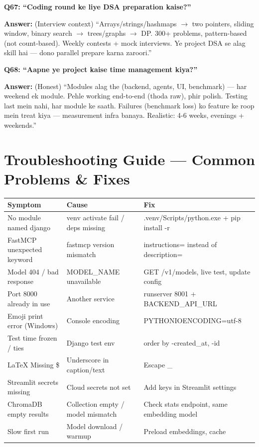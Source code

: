 \begin{interviewbox}
\textbf{Q67: ``Coding round ke liye DSA preparation kaise?''}

\textbf{Answer:} (Interview context) ``Arrays/strings/hashmaps $\rightarrow$ two pointers, sliding window, binary search $\rightarrow$ trees/graphs $\rightarrow$ DP. 300+ problems, pattern-based (not count-based). Weekly contests + mock interviews. Ye project DSA se alag skill hai --- dono parallel prepare karna zaroori.''
\end{interviewbox}

\begin{interviewbox}
\textbf{Q68: ``Aapne ye project kaise time management kiya?''}

\textbf{Answer:} (Honest) ``Modules alag the (backend, agents, UI, benchmark) --- har weekend ek module. Pehle working end-to-end (thoda raw), phir polish. Testing last mein nahi, har module ke saath. Failures (benchmark loss) ko feature ke roop mein treat kiya --- measurement infra banaya. Realistic: 4-6 weeks, evenings + weekends.''
\end{interviewbox}

\section{Troubleshooting Guide --- Common Problems \& Fixes}

\begin{longtable}{p{5.2cm} p{4.2cm} p{4.6cm}}
\toprule
\textbf{Symptom} & \textbf{Cause} & \textbf{Fix} \\
\midrule
No module named django & venv activate fail / deps missing & .venv/Scripts/python.exe + pip install -r \\
FastMCP unexpected keyword & fastmcp version mismatch & instructions= instead of description= \\
Model 404 / bad response & MODEL\_NAME unavailable & GET /v1/models, live test, update config \\
Port 8000 already in use & Another service & runserver 8001 + BACKEND\_API\_URL \\
Emoji print error (Windows) & Console encoding & PYTHONIOENCODING=utf-8 \\
Test time frozen / ties & Django test env & order by -created\_at, -id \\
LaTeX Missing \$ & Underscore in caption/text & Escape \_ \\
Streamlit secrets missing & Cloud secrets not set & Add keys in Streamlit settings \\
ChromaDB empty results & Collection empty / model mismatch & Check stats endpoint, same embedding model \\
Slow first run & Model download / warmup & Preload embeddings, cache \\
\bottomrule
\end{longtable}

